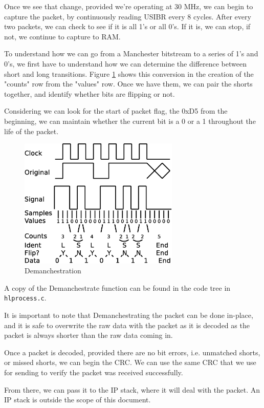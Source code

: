\documentclass{article}
\begin{document}
Once we see that change, provided we're operating at 30 MHz, we can begin to capture the packet,
by continuously reading USIBR every 8 cycles.  After every two packets, we can check to see if
it is all 1's or all 0's.  If it is, we can stop, if not, we continue to capture to RAM.

To understand how we can go from a Manchester bitstream to a series of 1's and 0's, we first
have to understand how we can determine the difference between short and long transitions.  Figure
\ref{demanchester} shows this conversion in the creation of the "counts" row from the "values" row.
Once we have them, we can pair the shorts together, and identify whether bits are flipping or not.

Considering we can look for the start of packet flag, the 0xD5 from the beginning, we can maintain
whether the current bit is a 0 or a 1 throughout the life of the packet.

\begin{figure}
    \centering
    \includegraphics[width=3.0in]{demanchester}
    \caption{Demanchestration}
    \label{demanchester}
\end{figure}

A copy of the Demanchestrate function can be found in the code tree in \texttt{hlprocess.c}.

It is important to note that Demanchestrating the packet can be done in-place, and it is
safe to overwrite the raw data with the packet as it is decoded as the packet is always shorter
than the raw data coming in.

Once a packet is decoded, provided there are no bit errors, i.e. unmatched shorts, or missed
shorts, we can begin the CRC.  We can use the same CRC that we use for sending to verify the packet
was received successfully.

From there, we can pass it to the IP stack, where it will deal with the packet.  An IP 
stack is outside the scope of this document.
\end{document}
